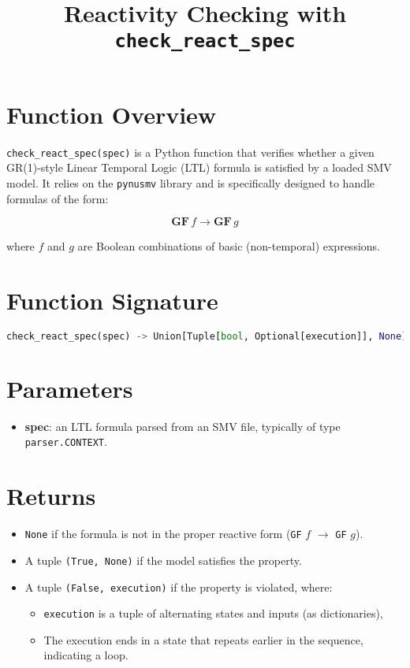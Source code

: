 \documentclass{article}
\title{Reactivity Checking with \texttt{check\_react\_spec}}
\author{}
\date{}
\begin{document}
\maketitle

\section*{Function Overview}

\texttt{check\_react\_spec(spec)} is a Python function that verifies whether a given GR(1)-style Linear Temporal Logic (LTL) formula is satisfied by a loaded SMV model. It relies on the \texttt{pynusmv} library and is specifically designed to handle formulas of the form:

\[
  \textbf{GF} \, f \rightarrow \textbf{GF} \, g
\]

where $f$ and $g$ are Boolean combinations of basic (non-temporal) expressions.

\section*{Function Signature}

\begin{lstlisting}[language=Python]
check_react_spec(spec) -> Union[Tuple[bool, Optional[execution]], None]
\end{lstlisting}

\section*{Parameters}

\begin{itemize}[leftmargin=*]
  \item \textbf{spec}: an LTL formula parsed from an SMV file, typically of type \texttt{parser.CONTEXT}.
\end{itemize}

\section*{Returns}

\begin{itemize}[leftmargin=*]
  \item \texttt{None} if the formula is not in the proper reactive form (\texttt{GF} $f$ $\rightarrow$ \texttt{GF} $g$).
  \item A tuple \texttt{(True, None)} if the model satisfies the property.
  \item A tuple \texttt{(False, execution)} if the property is violated, where:
        \begin{itemize}
          \item \texttt{execution} is a tuple of alternating states and inputs (as dictionaries),
          \item The execution ends in a state that repeats earlier in the sequence, indicating
                a loop.
        \end{itemize}
\end{itemize}
\end{document}
